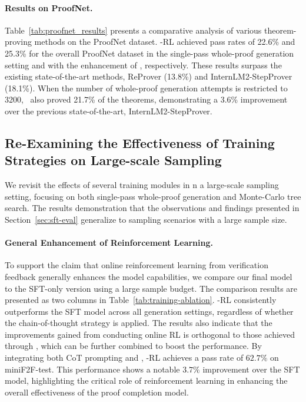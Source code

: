 

\paragraph{Results on ProofNet.}
Table~\ref{tab:proofnet_results} presents a comparative analysis of various theorem-proving methods on the ProofNet dataset. \thiswork-RL achieved pass rates of 22.6\% and 25.3\% for the overall ProofNet dataset in the single-pass whole-proof generation setting and with the enhancement of \treesearch, respectively. These results surpass the existing state-of-the-art methods, ReProver (13.8\%) and InternLM2-StepProver (18.1\%). When the number of whole-proof generation attempts is restricted to 3200, \thiswork~also proved 21.7\% of the theorems, demonstrating a 3.6\% improvement over the previous state-of-the-art, InternLM2-StepProver.



\vspace{-0.2in}

\subsection{Re-Examining the Effectiveness of Training Strategies on Large-scale Sampling} \label{sec:large-train-eval}

We revisit the effects of several training modules in n a large-scale sampling setting, focusing on both single-pass whole-proof generation and Monte-Carlo tree search. The results demonstration that the observations and findings presented in Section~\ref{sec:sft-eval} generalize to sampling scenarios with a large sample size.

\vspace{-0.1in}

\paragraph{General Enhancement of Reinforcement Learning.}
To support the claim that online reinforcement learning from verification feedback generally enhances the model capabilities, we compare our final model to the SFT-only version using a large sample budget.
The comparison results are presented as two columns in Table~\ref{tab:training-ablation}.
\thiswork-RL consistently outperforms the SFT model across all generation settings, regardless of whether the chain-of-thought strategy is applied.
The results also indicate that the improvements gained from conducting online RL is orthogonal to those achieved through \treesearch, which can be further combined to boost the performance.
By integrating both CoT prompting and \treesearch, \thiswork-RL achieves a pass rate of $62.7\%$ on miniF2F-test.
This performance shows a notable $3.7\%$ improvement over the SFT model, highlighting the critical role of reinforcement learning in enhancing the overall effectiveness of the proof completion model.

